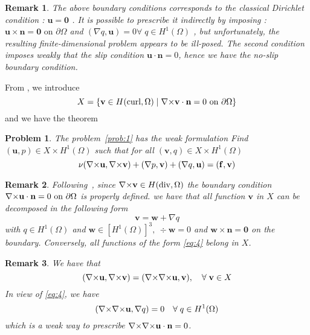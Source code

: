 \documentclass{article}
\newtheorem{problem}{Problem}
\newtheorem{remark}{Remark}
\newcommand{\ST}{\ensuremath{\; | \;}\xspace}
\newcommand{\Hdiv}{\ensuremath{H(\mathrm{div},\Omega)}\xspace}
\newcommand{\Hcurl}{\ensuremath{H(\mathrm{curl},\Omega)}\xspace}
\newcommand{\Hp}[1][1]{\ensuremath{H^{#1}(\Omega)}\xspace}
\begin{document}
\begin{remark}
  \label{rem:6}
  The above boundary conditions corresponds to the classical Dirichlet condition
  : $\mathbf{u} = \mathbf{0}$ . It is possible to prescribe it indirectly by
  imposing : $\mathbf{u}\times \mathbf{n} = \mathbf{0} \mbox{ on } \partial
  \Omega$ and $(\nabla q, \mathbf{u}) = 0 \forall\; q \in \Hp$ , but
  unfortunately, the resulting finite-dimensional problem appears to be
  ill-posed. The second condition imposes weakly that the slip condition
  $\mathbf{u} \cdot \mathbf{n} = 0$, hence we have the no-slip boundary
  condition.
\end{remark}

From \cite{girault90-1}, we introduce
\begin{equation*}
  X = \{ \mathbf{v} \in \Hcurl \ST \curl \mathbf{v} \cdot \mathbf{n} = 0 \mbox{
  on } \partial \Omega \}
\end{equation*}
and we have the theorem
\begin{problem}
  \label{prob:4}
  The problem~\ref{prob:1} has the weak formulation
  Find $(\mathbf{u},p)  \in X \times \Hp$ such that
  for all $(\mathbf{v},q) \in X \times \Hp$
  \begin{equation}
    \label{eq:3}
    \nu ({\nabla\times} \mathbf{u}, {\nabla\times} \mathbf{v} ) + (\nabla p, \mathbf{v}) + (\nabla
    q, \mathbf{u} ) = (\mathbf{f}, \mathbf{v})
  \end{equation}
\end{problem}

\begin{remark}
  \label{rem:1}
  Following~\cite{girault90-1}, since $\curl\mathbf{v} \in \Hdiv$ the boundary condition ${\nabla\times} \mathbf{u}
  \cdot \mathbf{n}=0 \mbox{ on } \partial \Omega $ is properly
  defined. we have that all function $\mathbf{v}$ in $X$ can be
  decomposed in the following form
  \begin{equation}
    \label{eq:4}
    \mathbf{v} = \mathbf{w} + \nabla q
  \end{equation}
  with $q \in \Hp$ and $\mathbf{w} \in [\Hp]^3,\ \div \mathbf{w}
  = 0 $ and $\mathbf{w} \times \mathbf{n} = \mathbf{0}$ on the
  boundary. Conversely, all functions of the form \eqref{eq:4} belong in $X$.
\end{remark}

\begin{remark}
  \label{rem:2}
  We have that
  \begin{equation}
    \label{eq:5}
    ({\nabla\times}\mathbf{u}, {\nabla\times}\mathbf{v}) = ({\nabla\times} {\nabla\times} \mathbf{u}, \mathbf{v} ),
    \quad \forall\; \mathbf{v} \in X
  \end{equation}
In view of \eqref{eq:4}, we have
\begin{equation}
  \label{eq:6}
  (\curl \curl \mathbf{u}, \nabla q ) =  0\quad \forall\; q \in \Hp
\end{equation}
which is a weak way to prescribe ${\nabla\times} {\nabla\times} \mathbf{u} \cdot \mathbf{n} = 0$.
\end{remark}
\end{document}
